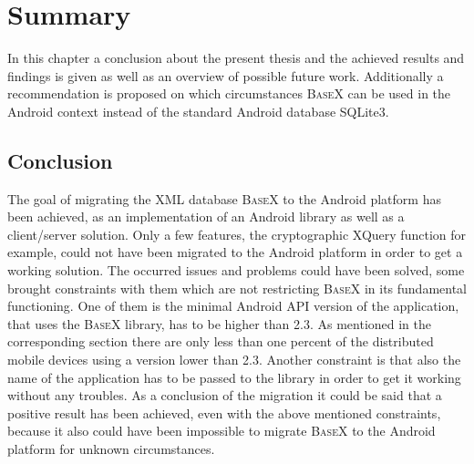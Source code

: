 \chapter{Summary}
\label{cha:summery}
In this chapter a conclusion about the present thesis and the achieved results and findings is given as well as an overview of possible future work.
Additionally a recommendation is proposed on which circumstances \textsc{BaseX} can be used in the Android context instead of the standard Android database SQLite3.
\section{Conclusion}
\label{sec:summery:conclusion}
The goal of migrating the XML database \textsc{BaseX} to the Android platform has been achieved, as an implementation of an Android library as well as a \mbox{client/server} solution.
Only a few features, the cryptographic XQuery function for example, could not have been migrated to the Android platform in order to get a working solution.
The occurred issues and problems could have been solved, some brought constraints with them which are not restricting \textsc{BaseX} in its fundamental functioning.
One of them is the minimal Android API version of the application, that uses the \textsc{BaseX} library, has to be higher than 2.3.
As mentioned in the corresponding section there are only less than one percent of the distributed mobile devices using a version lower than 2.3.
Another constraint is that also the name of the application has to be passed to the library in order to get it working without any troubles.
As a conclusion of the migration it could be said that a positive result has been achieved, even with the above mentioned constraints, because it also could have been impossible to migrate \textsc{BaseX} to the Android platform for unknown circumstances.





